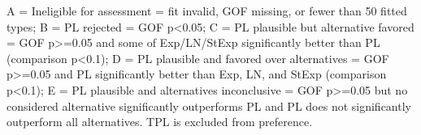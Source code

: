 \begin{flushleft}\footnotesize A = Ineligible for assessment = fit invalid, GOF missing, or fewer than 50 fitted types; B = PL rejected = GOF p<0.05; C = PL plausible but alternative favored = GOF p>=0.05 and some of Exp/LN/StExp significantly better than PL (comparison p<0.1); D = PL plausible and favored over alternatives = GOF p>=0.05 and PL significantly better than Exp, LN, and StExp (comparison p<0.1); E = PL plausible and alternatives inconclusive = GOF p>=0.05 but no considered alternative significantly outperforms PL and PL does not significantly outperform all alternatives. TPL is excluded from preference.\end{flushleft}
